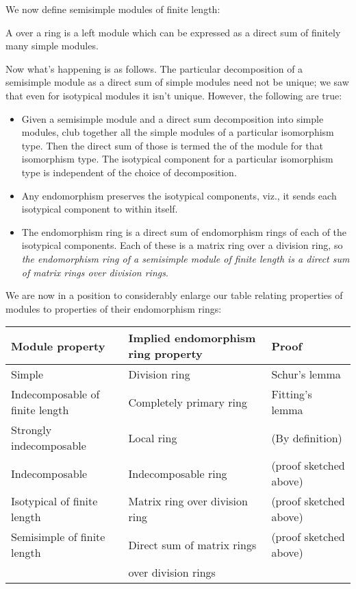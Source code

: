 \documentclass[a4paper]{amsart}
\begin{document}
We now define semisimple modules of finite length:

\begin{definer}
  A  over a ring is a
  left module which can be expressed as a direct sum of finitely many
  simple modules.
\end{definer}

Now what's happening is as follows. The particular decomposition of a
semisimple module as a direct sum of simple modules need not be
unique; we saw that even for isotypical modules it isn't unique. However,
the following are true:

\begin{itemize}

\item Given a semisimple module and a direct sum decomposition into
  simple modules, club together all the simple modules of a particular
  isomorphism type. Then the direct sum of those is termed the
   of the module for that isomorphism
  type. The isotypical component for a particular isomorphism type is
  independent of the choice of decomposition.

\item Any endomorphism preserves the isotypical components, viz., it
  sends each isotypical component to within itself.

\item The endomorphism ring is a direct sum of endomorphism rings of
  each of the isotypical components. Each of these is a matrix ring
  over a division ring, so {\em the endomorphism ring of a semisimple
  module of finite length is a direct sum of matrix rings over
  division rings}.

\end{itemize}

We are now in a position to considerably enlarge our table relating
properties of modules to properties of their endomorphism rings:

\begin{tabular}{|l|l|l|}
  \hline
  Module property & Implied endomorphism ring property & Proof\\
  \hline
  Simple & Division ring & Schur's lemma\\
  Indecomposable of finite length & Completely primary ring & Fitting's lemma\\
  Strongly indecomposable & Local ring & (By definition)\\
  Indecomposable & Indecomposable ring & (proof sketched above)\\
  Isotypical of finite length & Matrix ring over division ring & (proof sketched above)\\
  Semisimple of finite length & Direct sum of matrix rings & (proof sketched above)\\
  & over division rings & \\
  \hline
\end{tabular}
\end{document}
